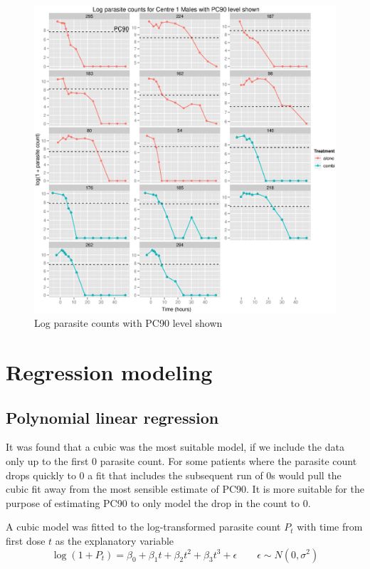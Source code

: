 \begin{figure}[p]
\begin{center}
\includegraphics[width=6.1in]{log901M.eps}
\caption{Log parasite counts with PC90 level shown}
\label{log901M}
\end{center}
\end{figure}
\section{Regression modeling}
\subsection{Polynomial linear regression}
It was found that a cubic was the most suitable model, if we include the data only up to the first 0 parasite count. For some patients where the parasite count drops quickly to 0 a fit that includes the subsequent run of 0s would pull the cubic fit away from the most sensible estimate of PC90. It is more suitable for the purpose of estimating PC90 to only model the drop in the count to 0.

A cubic model was fitted to the log-transformed parasite count $P_{t}$ with time from first dose $t$ as the explanatory variable
$$\log(1+P_{t})=\beta_0+\beta_1t+\beta_2t^2+\beta_3t^3+\epsilon\quad\quad\epsilon\sim N(0,\sigma^2)$$

